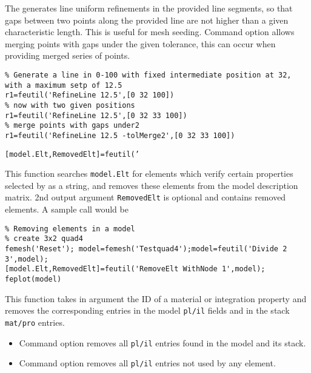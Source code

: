 
The  generates line uniform refinements in the provided line segments, so that gaps between two points along the provided line are not higher than a given characteristic length. This is useful for mesh seeding.
Command option  allows merging points with gaps under the given tolerance, this can occur when providing merged series of points.

\begin{verbatim}
% Generate a line in 0-100 with fixed intermediate position at 32, with a maximum setp of 12.5
r1=feutil('RefineLine 12.5',[0 32 100])
% now with two given positions
r1=feutil('RefineLine 12.5',[0 32 33 100])
% merge points with gaps under2
r1=feutil('RefineLine 12.5 -tolMerge2',[0 32 33 100])
\end{verbatim}


{\tt [model.Elt,RemovedElt]=feutil('} 

 This function searches {\tt model.Elt} for elements which verify certain properties selected by  as a  string, and removes these elements from the model description matrix. 2nd output argument {\tt RemovedElt} is optional and contains removed elements.
A sample call would be

\begin{verbatim}
% Removing elements in a model
% create 3x2 quad4 
femesh('Reset'); model=femesh('Testquad4');model=feutil('Divide 2 3',model); 
[model.Elt,RemovedElt]=feutil('RemoveElt WithNode 1',model);
feplot(model)
\end{verbatim}%


 This function takes in argument the ID of a material or integration property and removes the corresponding entries in the model {\tt pl/il} fields and in the stack {\tt mat/pro} entries.

\begin{itemize}
\item Command option  removes all {\tt pl/il} entries found in the model and its stack.
\item Command option  removes all {\tt pl/il} entries not used by any element.
\end{itemize}

